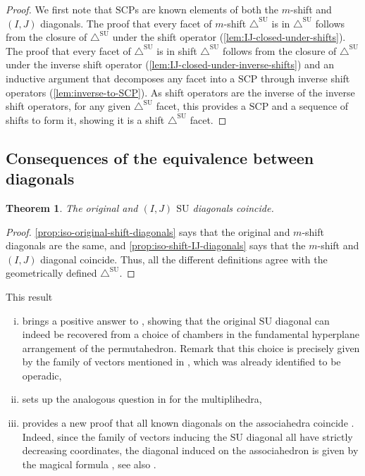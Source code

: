\documentclass{amsart}
\newtheorem{theorem}{Theorem}[section]
\theoremstyle{definition}
\newcommand{\SU}{\mathrm{SU}}
\newcommand{\SUD}{\triangle^{\mathrm{SU}}}
\newcommand{\SCP}{\mathrm{SCP}}
\begin{document}
\begin{proof}
    We first note that $\SCP$s are known elements of both the $m$-shift and $(I,J)$ diagonals.
    The proof that every facet of $m$-shift $\SUD$ is in $\SUD$ follows from the closure of $\SUD$ under the shift operator (\cref{lem:IJ-closed-under-shifts}).
    The proof that every facet of $\SUD$ is in shift $\SUD$ follows from the closure of $\SUD$ under the inverse shift operator (\cref{lem:IJ-closed-under-inverse-shifts}) and an inductive argument that decomposes any facet into a $\SCP$ through inverse shift operators (\cref{lem:inverse-to-SCP}).
    As shift operators are the inverse of the inverse shift operators, for any given $\SUD$ facet, this provides a $\SCP$ and a sequence of shifts to form it, showing it is a shift $\SUD$ facet.
\end{proof}


\subsection{Consequences of the equivalence between diagonals}

\begin{theorem}
    The original and $(I,J)$ $\SU$ diagonals coincide.
\end{theorem}

\begin{proof}
    \cref{prop:iso-original-shift-diagonals} says that the original and $m$-shift diagonals are the same, and \cref{prop:iso-shift-IJ-diagonals} says that the $m$-shift and $(I,J)$ diagonal coincide.
    Thus, all the different definitions agree with the geometrically defined $\SUD$. 
\end{proof}

This result
\begin{enumerate}[(i)]
    \item brings a positive answer to \cite[Remark 2.19]{LA21}, showing that the original $\SU$ diagonal can indeed be recovered from a choice of chambers in the fundamental hyperplane arrangement of the permutahedron. 
    Remark that this choice is precisely given by the family of vectors mentioned in \cite[Remark 4.19]{LA21}, which was already identified to be operadic,
    \item sets up the analogous question in \cite[Remark 3.9]{MazuirLA22} for the multiplihedra,
    \item provides a new proof that all known diagonals on the associahedra coincide \cite{saneblidzeComparingDiagonalsAssociahedra2022}.
    Indeed, since the family of vectors inducing the $\SU$ diagonal all have strictly decreasing coordinates, the diagonal induced on the associahedron is given by the magical formula \cite[Theorem 2]{masudaDiagonalAssociahedra2021}, see also \cite[Proposition 3.8]{LA21}.
\end{enumerate}
\end{document}

